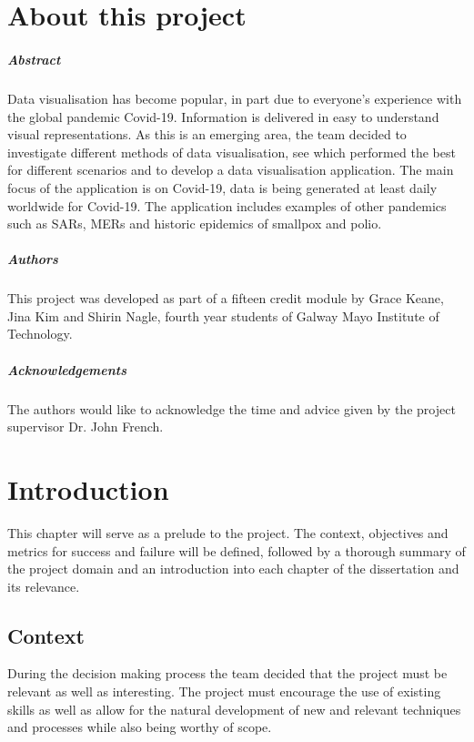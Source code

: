 
\chapter*{About this project}
\paragraph{Abstract}
Data visualisation has become popular, in part due to everyone's experience with the global pandemic Covid-19. Information is delivered in easy to understand visual representations. As this is an emerging area, the team decided to investigate different methods of data visualisation, see which performed the best for different scenarios and to develop a data visualisation application. The main focus of the application is on Covid-19, data is being generated at least daily worldwide for Covid-19. The application includes examples of other pandemics such as SARs, MERs and historic epidemics of smallpox and polio.

\paragraph{Authors}
This project was developed as part of a fifteen credit module by Grace Keane, Jina Kim and Shirin Nagle, fourth year students of Galway Mayo Institute of Technology.

\paragraph{Acknowledgements} The authors would like to acknowledge the time and advice given by the project supervisor Dr. John French.

\chapter{Introduction}
This chapter will serve as a prelude to the project. The context, objectives and metrics for success and failure will be defined, followed by a thorough summary of the project domain and an introduction into each chapter of the dissertation and its relevance.

\section{Context}
During the decision making process the team decided that the project must be relevant as well as interesting. The project must encourage the use of existing skills as well as allow for the natural development of new and relevant techniques and processes while also being worthy of scope.

